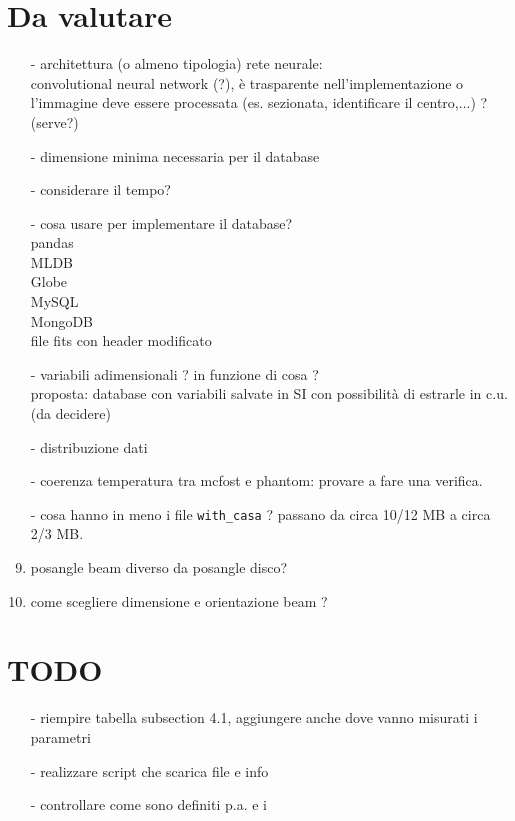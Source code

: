 \documentclass[DIN, pagenumber=false, fontsize=11pt, parskip=half]{scrartcl}
\begin{document}
\section{Da valutare}
\begin{enumerate}
 \item[-] architettura (o almeno tipologia) rete neurale: \\ convolutional neural network (?), è trasparente nell'implementazione o l'immagine deve essere processata (es. sezionata, identificare il centro,...) ? (serve?)
 \item[-] dimensione minima necessaria per il database
 \item[-] considerare il tempo?
 \item[-] cosa usare per implementare il database? \\ pandas \\ MLDB \\ Globe \\ MySQL \\ MongoDB \\ file fits con header modificato
 \item[-] variabili adimensionali ? in funzione di cosa ? \\ proposta: database con variabili salvate in SI con possibilità di estrarle in c.u. (da decidere)
 \item[-] distribuzione dati
 \item[-] coerenza temperatura tra mcfost e phantom: provare a fare una verifica. \item[-] cosa hanno in meno i file \lstinline{with_casa} ? passano da circa 10/12 MB a circa 2/3 MB.
 \item[-] posangle beam diverso da posangle disco?
 \item[-] come scegliere dimensione e orientazione beam ? 
\end{enumerate}

\section{TODO}
\begin{enumerate}
 \item[-] riempire tabella subsection 4.1, aggiungere anche dove vanno misurati i parametri
 \item[-] realizzare script che scarica file e info
 \item[-] controllare come sono definiti p.a. e i
\end{enumerate}
\end{document}
